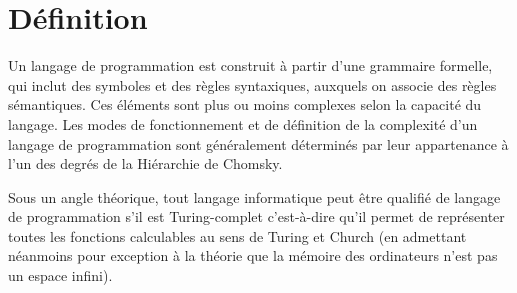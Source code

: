 \documentclass[a4paper,12pt]{article}
\begin{document}
\section{Définition}

Un langage de programmation est construit à partir d'une grammaire formelle, qui inclut des symboles et des règles syntaxiques, auxquels on associe des règles sémantiques. Ces éléments sont plus ou moins complexes selon la capacité du langage. Les modes de fonctionnement et de définition de la complexité d'un langage de programmation sont généralement déterminés par leur appartenance à l'un des degrés de la Hiérarchie de Chomsky.

Sous un angle théorique, tout langage informatique peut être qualifié de langage de programmation s'il est Turing-complet c'est-à-dire qu'il permet de représenter toutes les fonctions calculables au sens de Turing et Church (en admettant néanmoins pour exception à la théorie que la mémoire des ordinateurs n'est pas un espace infini)\cite{lando}.
\end{document}
